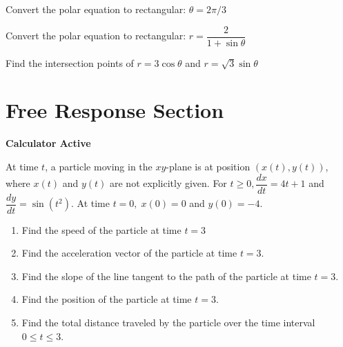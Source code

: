\documentclass[11pt,answers]{exam}
\begin{document}
\begin{questions}
\begin{minipage}{\linewidth}
\question Convert the polar equation to rectangular: $\theta = 2\pi/3$
 \answerline[$y = -\sqrt3 x$]


\end{minipage}

\begin{minipage}{\linewidth}


\question Convert the polar equation to rectangular: $r = \dfrac{2}{1 + \sin \theta}$
 \answerline[$x^2 + y^2 = (y-2)^2$]
\end{minipage}

\begin{minipage}{\linewidth}


\question Find the intersection points of $r = 3 \cos \theta$ and $r = \sqrt3 \sin \theta$


\answerline[ $\{ \pi/3, 4\pi/3 \}$]
\end{minipage}

\end{questions}

\clearpage
\section*{Free Response Section}
\noindent
\textbf{Calculator Active}
\vspace{2ex}

At time $t$, a particle moving in the $x y$-plane is at
position $(x(t), y(t))$, where $x(t)$ and $y(t)$ are
 not explicitly given. For
 $t \geq 0, \dfrac{d x}{d t}=4 t+1$ and
 $\dfrac{d y}{d t}=\sin \left(t^{2}\right)$.
  At time $t=0,\; x(0)=0$ and $y(0)=-4$.

\begin{enumerate}
\item Find the speed of the particle at time
$t=3$\\[1in]

\item Find the acceleration vector of the particle at time $t=3$.\\[1in]

\item Find the slope of the line tangent to
 the path of the particle at time $t=3$.\\[1in]

\item Find the position of the particle at
time $t=3$.\\[1.5in]

\item Find the total distance traveled by the
particle over the time interval $0 \leq t \leq 3$.
\end{enumerate}
\end{document}
